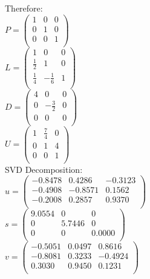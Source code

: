 \documentclass{article}
\begin{document}
Therefore: \\
$P =
\begin{pmatrix}
    1 & 0 & 0 \\
    0 & 1 & 0 \\
    0 & 0 & 1 \\
\end{pmatrix}
$ \\
$L = 
\begin{pmatrix}
    1 & 0 & 0 \\
    \frac{1}{2} & 1 & 0 \\
    \frac{1}{4} & -\frac{1}{6} & 1 \\
\end{pmatrix}$\\
$D = 
\begin{pmatrix}
    4 & 0 & 0 \\
    0 & -\frac{3}{2} & 0 \\
    0 & 0 & 0 \\
\end{pmatrix}
$ \\
$
U = 
\begin{pmatrix}
    1 & \frac{7}{4} & 0 \\
    0 & 1 & 4 \\
    0 & 0 & 1 \\
\end{pmatrix}
$ \\
SVD Decomposition:\\
$
u =
\begin{pmatrix}
   -0.8478  &  0.4286 &  -0.3123 \\
   -0.4908  & -0.8571 &   0.1562 \\
   -0.2008  &  0.2857 &   0.9370 \\
\end{pmatrix}$\\

$s =
\begin{pmatrix}
    9.0554    &     0     &    0\\
         0   & 5.7446    &     0\\
         0     &    0  &  0.0000\\

\end{pmatrix}$\\

$v =
\begin{pmatrix}
   -0.5051   & 0.0497  &  0.8616 \\
   -0.8081   & 0.3233  & -0.4924 \\
    0.3030   & 0.9450  &  0.1231 \\
\end{pmatrix}$
\end{document}
